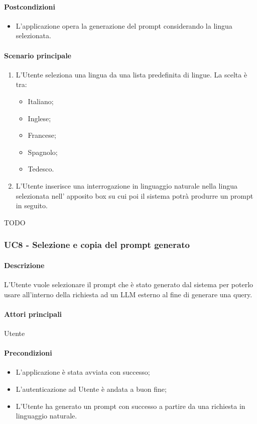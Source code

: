 \paragraph*{Postcondizioni}
\begin{itemize}
  \item L'applicazione opera la generazione del prompt considerando la lingua selezionata.
\end{itemize}

\paragraph*{Scenario principale}
\begin{enumerate}
  \item L’Utente seleziona una lingua da una lista predefinita di lingue. La scelta è tra:
    \begin{itemize}
      \item Italiano;
      \item Inglese;
      \item Francese;
      \item Spagnolo;
      \item Tedesco.
    \end{itemize}
  \item L’Utente inserisce una interrogazione in linguaggio naturale nella lingua selezionata nell’ apposito box su cui poi il sistema potrà produrre un prompt in seguito. 
\end{enumerate}

TODO


\subsubsection{UC8 - Selezione e copia del prompt generato}\label{UC8}

\paragraph*{Descrizione}
L’Utente vuole selezionare il prompt che è stato generato dal sistema per poterlo usare all’interno della richiesta ad un LLM esterno al fine di generare una query.

\paragraph*{Attori principali} Utente

\paragraph*{Precondizioni}
\begin{itemize}
  \item L'applicazione è stata avviata con successo;
  \item L’autenticazione ad Utente è andata a buon fine;
  \item L’Utente ha generato un prompt con successo a partire da una richiesta in linguaggio naturale.  
\end{itemize}

